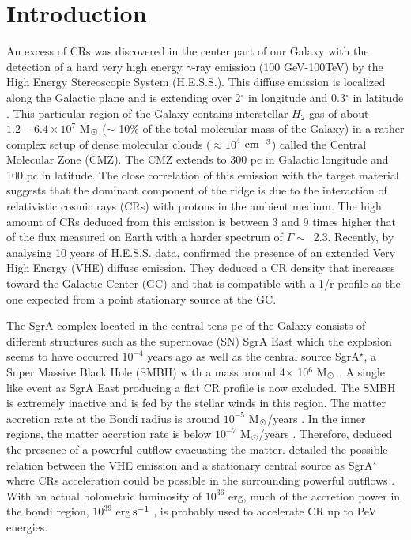 \documentclass[a4paper,fleqn,usenatbib]{mnras}
\begin{document}
\section{Introduction}
\label{intro}
An excess of CRs was discovered in the center part of our Galaxy with the detection of a hard very high energy $\gamma$-ray emission (100 GeV-100TeV) by the High Energy Stereoscopic System (H.E.S.S.). This diffuse emission is localized along the Galactic plane and is extending over 2$^\circ$ in longitude and 0.3$^\circ$ in latitude \citep{2006Natur.439..695A}. This particular region of the Galaxy contains interstellar $H_2$ gas of about $1.2-6.4 \times 10^7$ M$\rm_{\odot}$ \citep{1998A&A...331..959D} ($\sim$ 10\% of the total molecular mass of the Galaxy) in a rather complex setup of dense molecular clouds ($\approx 10^4$ $\rm cm^{-3}$) called the Central Molecular Zone (CMZ). The CMZ  extends to 300 pc in Galactic longitude and 100 pc in latitude. The close correlation of this emission with the target material suggests that the dominant component of the ridge is due to the interaction of relativistic cosmic rays (CRs) with protons in the ambient medium. The high amount of CRs deduced from this emission is between 3 and 9 times higher that of the flux measured on Earth with a harder spectrum of $\Gamma \sim \, $ 2.3. Recently, by analysing 10 years of H.E.S.S. data, \citet{2016Natur.531..476H} confirmed the presence of an extended Very High Energy (VHE) diffuse emission. They deduced a CR density that increases toward the Galactic Center (GC) and that is compatible with a 1/r profile as the one expected from a point stationary source at the GC.

The SgrA complex located in the central tens pc of the Galaxy consists of different structures such as the supernovae (SN) SgrA East which the explosion seems to have occurred $10^{-4}$ years ago \citep{2013ApJ...777..146Z} as well as the central source SgrA$^\star$, a Super Massive Black Hole (SMBH) with a mass around 4$\times$ 10$^6$ M$\rm_{\odot}$ \citep{2008ApJ...689.1044G}. A single like event as SgrA East \citep{2006Natur.439..695A} producing a flat CR profile is now excluded. The SMBH is extremely inactive and is fed by the stellar winds in this region. The matter accretion rate at the Bondi radius is around $10^{-5}$ M$\rm_{\odot}$/years \citep{2003ApJ...591..891B}. In the inner regions, the matter accretion rate is below $10^{-7}$ M$\rm_{\odot}$/years \citep{2007ApJ...654L..57M}. Therefore, \citet{2013Sci...341..981W} deduced the presence of a powerful outflow evacuating the matter. \citet{2016Natur.531..476H} detailed the possible relation between the VHE emission and a stationary central source as SgrA$^\star$ where CRs acceleration could be possible in the surrounding powerful outflows \citep{2006ApJ...647.1099L, 2013Sci...341..981W}. With an actual bolometric luminosity of $10^{36}$ erg, much of the accretion power in the bondi region, $10^{39}$ erg$\rm \, s^{-1}$ \cite{2006MNRAS.367..937W}, is probably used to accelerate CR up to PeV energies.  
\end{document}
